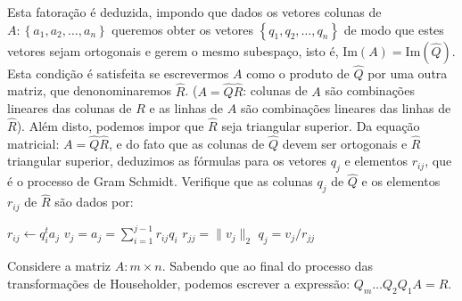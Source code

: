 \documentclass[a4paper,12pt, leqno, answers]{exam}
\begin{document}
\begin{questions}
    Esta fatora\c{c}\~{a}o \'{e} deduzida, impondo que dados os vetores colunas de $A : \left\{ a_1, a_2, \ldots, a_n \right\}$ queremos obter os vetores $\left\{ q_1, q_2, \ldots, q_n \right\}$ de modo que estes vetores sejam ortogonais e gerem o mesmo subespa\c{c}o, isto \'{e}, $\text{Im}(A) = \text{Im}(\hat{Q})$. Esta condi\c{c}\~{a}o \'{e} satisfeita se escrevermos $A$ como o produto de $\hat{Q}$ por uma outra matriz, que denonominaremos $\hat{R}$. ($A = \hat{Q} \hat{R}$: colunas de $A$ s\~{a}o combina\c{c}\~{o}es lineares das colunas de $R$ e as linhas de $A$ s\~{a}o combina\c{c}\~{o}es lineares das linhas de $\hat{R}$). Al\'{e}m disto, podemos impor que $\hat{R}$ seja triangular superior. Da equa\c{c}\~{a}o matricial: $A = \hat{Q} \hat{R}$, e do fato que as colunas de $\hat{Q}$ devem ser ortogonais e $\hat{R}$ triangular superior, deduzimos as f\'{o}rmulas para os vetores $q_j$ e elementos $r_{ij}$, que \'{e} o processo de Gram Schmidt. Verifique que as colunas $q_j$ de $\hat{Q}$ e os elementos $r_{ij}$ de $\hat{R}$ s\~{a}o dados por:
    \begin{algorithmic}
                \State $r_{ij} \leftarrow q_i^t a_j$
            \EndFor
            \State $v_j = a_j = \sum_{i = 1}^{j - 1} r_{ij} q_i$
            \State $r_{jj} = \| v_j \|_2$
            \State $q_j = v_j / r_{jj}$
        \EndFor
    \end{algorithmic}
    \begin{solution}
        
    \end{solution}

    \question Considere a matriz $A: m \times n$. Sabendo que ao final do processo das transforma\c{c}\~{o}es de Householder, podemos escrever a express\~{a}o: $Q_m \ldots Q_2 Q_1 A = R$.
\end{questions}
\end{document}
